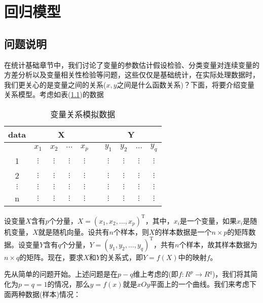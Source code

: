 
\chapter{回归模型}
\section{问题说明}\label{sec:问题说明}
    \par
    在统计基础章节中，我们讨论了变量的参数估计假设检验、分类变量对连续变量的方差分析以及变量相关性检验等问题，这些仅仅是基础统计，在实际处理数据时，我们更关心的是变量之间的关系($x,y$之间是什么函数关系)？下面，将要介绍变量关系模型。考虑如表(\ref{tab:变量关系模拟数据})的数据
    \begin{table}[H]
    \caption{变量关系模拟数据}
    \label{tab:变量关系模拟数据}
    \centering
    \begin{tabular}{|c|ccccccccc|}
    \hline
    data & \multicolumn{4}{c}{X} & {} & \multicolumn{4}{c|}{Y} \\
    \hline
    {} & $x_1$ & $x_2$ & $\cdots$ & $x_p$ & {} & $y_1$ & $y_2$ & $\ldots$ & $y_q$ \\
    \hline
    1  & $\vdots$ &  $\vdots$  & $\vdots$ & $\vdots$ & {} & $\vdots$ &  $\vdots$  & $\vdots$ & $\vdots$\\
    2  & $\vdots$ &  $\vdots$  & $\vdots$ & $\vdots$ & {} & $\vdots$ &  $\vdots$  & $\vdots$ & $\vdots$\\
    $\vdots$ & $\vdots$ &  $\vdots$  & $\vdots$ & $\vdots$ & {} & $\vdots$ &  $\vdots$  & $\vdots$ & $\vdots$\\
    n  & $\vdots$ &  $\vdots$  & $\vdots$ & $\vdots$ & {} & $\vdots$ &  $\vdots$  & $\vdots$ & $\vdots$\\
    \hline
    \end{tabular}
    \end{table}
    \par
    设变量$X$含有$p$个分量，$X = (x_1,x_2,\dots,x_p)^\mathrm{T}$，其中，$x_i$是一个变量，如果$x_i$是随机变量，$X$就是随机向量。设共有$n$个样本，则$X$的样本数据是一个$n\times p$的矩阵数据。设变量$Y$含有$q$个分量，$Y = (y_1,y_2,\dots,y_q)^{\mathrm{T}}$，共有$n$个样本，故其样本数据为$n\times q$的矩阵。现在，要求$X$和$Y$的关系式，即$Y = f(X)$中的映射$f$。
    \par
    先从简单的问题开始。上述问题是在$p-q$维上考虑的(即$f :R^p\rightarrow R^q$)，我们将其简化为$p = q=1$的情况，那么$y = f(x)$就是$xOy$平面上的一个曲线。我们来考虑下面两种数据(样本)情况：\\
